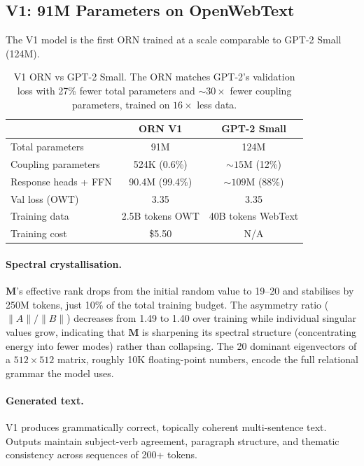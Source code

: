 \documentclass[11pt, a4paper]{article}
\newcommand{\M}{\mathbf{M}}
\theoremstyle{plain}
\theoremstyle{remark}
\begin{document}
\subsection{V1: 91M Parameters on OpenWebText}

The V1 model is the first ORN trained at a scale comparable to GPT-2 Small (124M).

\begin{table}[h]
\centering\small
\begin{tabular}{@{}lcc@{}}
\toprule
& \textbf{ORN V1} & \textbf{GPT-2 Small} \\
\midrule
Total parameters & 91M & 124M \\
Coupling parameters & 524K (0.6\%) & ${\sim}15$M (12\%) \\
Response heads + FFN & 90.4M (99.4\%) & ${\sim}109$M (88\%) \\
Val loss (OWT) & 3.35 & 3.35 \\
Training data & 2.5B tokens OWT & 40B tokens WebText \\
Training cost & \$5.50 & N/A \\
\bottomrule
\end{tabular}
\caption{V1 ORN vs GPT-2 Small. The ORN matches GPT-2's validation loss with 27\% fewer total parameters and ${\sim}30\times$ fewer coupling parameters, trained on $16\times$ less data.}
\label{tab:v1}
\end{table}

\paragraph{Spectral crystallisation.}
$\M$'s effective rank drops from the initial random value to 19--20 and stabilises by 250M tokens, just 10\% of the total training budget.
The asymmetry ratio ($\|A\| / \|B\|$) decreases from 1.49 to 1.40 over training while individual singular values grow, indicating that $\M$ is sharpening its spectral structure (concentrating energy into fewer modes) rather than collapsing.
The 20 dominant eigenvectors of a $512 \times 512$ matrix, roughly 10K floating-point numbers, encode the full relational grammar the model uses.

\paragraph{Generated text.}
V1 produces grammatically correct, topically coherent multi-sentence text.
Outputs maintain subject-verb agreement, paragraph structure, and thematic consistency across sequences of 200+ tokens.
\end{document}

